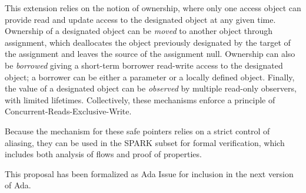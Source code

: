 \documentclass{llncs}
\begin{document}
This extension relies on the notion of ownership, where only one access object can provide read and update access to the designated object at any given time.
Ownership of a designated object can be \textit{moved} to another object through assignment, which deallocates the object previously designated
by the target of the assignment and leaves the source of the assignment null. Ownership can also be \textit{borrowed} giving a short-term borrower read-write access to the designated object; a borrower
can be either a parameter or a locally defined object. Finally, the value of a designated object can be \textit{observed} by multiple
read-only observers, with limited lifetimes. Collectively, these mechanisms enforce a principle of Concurrent-Reads-Exclusive-Write.

Because the mechanism for these safe pointers relies on a strict control of aliasing, they can be used in the SPARK subset for formal verification, which
includes both analysis of flows and proof of properties. 

This proposal has been formalized as Ada Issue \cite{AI2018} for inclusion in the next version of Ada.

\nolinenumbers
\printbibliography[title={References}]
\end{document}

